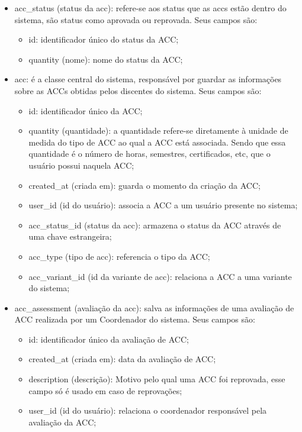 \begin{itemize}
    \item acc\_status (status da acc): refere-se aos status que as accs estão dentro do sistema, são status como aprovada ou reprovada. Seus campos são:
    \begin{itemize}
        \item id: identificador único do status da ACC;
        \item quantity (nome): nome do status da ACC;
    \end{itemize}

    \item acc: é a classe central do sistema, responsável por guardar as informações sobre as ACCs obtidas pelos discentes do sistema. Seus campos são:
    \begin{itemize}
        \item id: identificador único da ACC;
        \item quantity (quantidade): a quantidade refere-se diretamente à unidade de medida do tipo de ACC ao qual a ACC está associada. Sendo que essa quantidade é o número de horas, semestres, certificados, etc, que o usuário possui naquela ACC;
        \item created\_at (criada em): guarda o momento da criação da ACC;
        \item user\_id (id do usuário): associa a ACC a um usuário presente no sistema;
        \item acc\_status\_id (status da acc): armazena o status da ACC através de uma chave estrangeira;
        \item acc\_type (tipo de acc): referencia o tipo da ACC;
        \item acc\_variant\_id (id da variante de acc): relaciona a ACC a uma variante do sistema;
    \end{itemize}
    
    \item acc\_assessment (avaliação da acc): salva as informações de uma avaliação de ACC realizada por um Coordenador do sistema. Seus campos são:
    \begin{itemize}
        \item id: identificador único da avaliação de ACC;
        \item created\_at (criada em): data da avaliação de ACC;
        \item description (descrição): Motivo pelo qual uma ACC foi reprovada, esse campo só é usado em caso de reprovações;
        \item user\_id (id do usuário): relaciona o coordenador responsável pela avaliação da ACC;
    \end{itemize}
\end{itemize}

